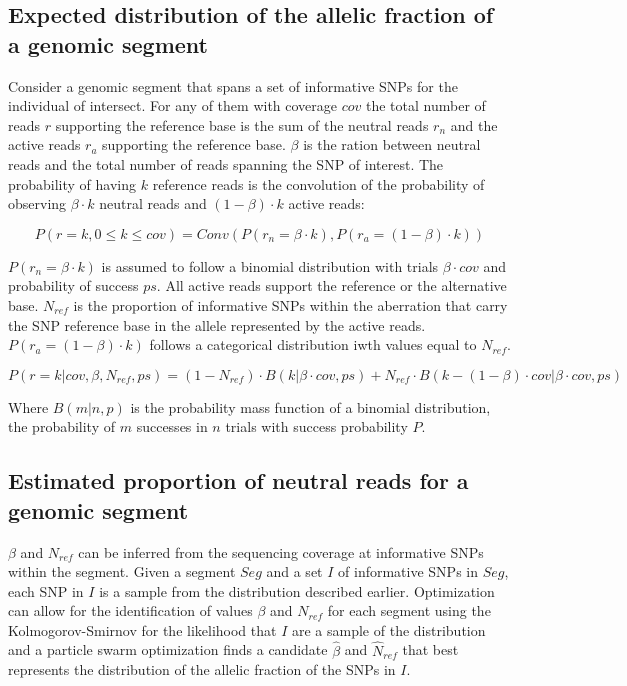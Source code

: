 	\subsection{Expected distribution of the allelic fraction of a genomic segment}
	Consider a genomic segment that spans a set of informative SNPs for the individual of intersect.
	For any of them with coverage $cov$ the total number of reads $r$ supporting the reference base is the sum of the neutral reads $r_n$ and the active reads $r_a$ supporting the reference base.
	$\beta$ is the ration between neutral reads and the total number of reads spanning the SNP of interest.
	The probability of having $k$ reference reads is the convolution of the probability of observing $\beta\cdot k$ neutral reads and $(1-\beta)\cdot k$ active reads:

	$$P(r = k, 0\le k\le cov) = Conv(P(r_n = \beta\cdot k), P(r_a = (1-\beta)\cdot k))$$

	$P(r_n = \beta\cdot k)$ is assumed to follow a binomial distribution with trials $\beta\cdot cov$ and probability of success $ps$.
	All active reads support the reference or the alternative base.
	$N_{ref}$ is the proportion of informative SNPs within the aberration that carry the SNP reference base in the allele represented by the active reads.
	$P(r_a = (1-\beta)\cdot k)$ follows a categorical distribution iwth values equal to $N_{ref}$.

	$$P(r = k|cov, \beta, N_{ref}, ps) = (1-N_{ref})\cdot B(k|\beta\cdot cov, ps) + N_{ref}\cdot B(k-(1-\beta)\cdot cov | \beta\cdot cov, ps)$$

	Where $B(m|n, p)$ is the probability mass function of a binomial distribution, the probability of $m$ successes in $n$ trials with success probability $P$.

	\subsection{Estimated proportion of neutral reads for a genomic segment}
	$\beta$ and $N_{ref}$ can be inferred from the sequencing coverage at informative SNPs within the segment.
	Given a segment $Seg$ and a set $I$ of informative SNPs in $Seg$, each SNP in $I$ is a sample from the distribution described earlier.
	Optimization can allow for the identification of values $\beta$ and $N_{ref}$ for each segment using the Kolmogorov-Smirnov for the likelihood that $I$ are a sample of the distribution and a particle swarm optimization finds a candidate $\hat{\beta}$ and $\hat{N}_{ref}$ that best represents the distribution of the allelic fraction of the SNPs in $I$.

